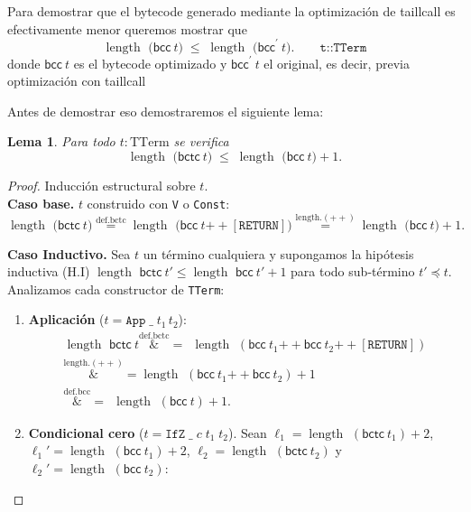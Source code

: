 \documentclass[12pt]{article}
\newcommand{\length}{\operatorname{length\  }}
\newcommand{\bcc}[1]{\mathsf{bcc}\ #1}
\newcommand{\bctc}[1]{\mathsf{bctc}\ #1}
\newcommand{\concat}{\mathbin{+\!\!+}}   %
\newtheorem{lemma}{Lema}
\theoremstyle{remark}
\newcommand{\bccp}[1]{\mathsf{bcc}^{\prime}\ #1}
\newcommand{\overeq}[1]{\overset{\mathrm{#1}}{=}}
\newcommand{\overeqa}[1]{\overset{\mathrm{#1}}&{=}}
\begin{document}
Para demostrar que el bytecode generado mediante la optimización de taillcall es efectivamente menor queremos mostrar que 
\[
  \length\!\bigl(\bcc{t}\bigr)\;\le\;
  \length\!\bigl(\bccp{t}\bigr). \qquad  \texttt{t::TTerm}
\]
donde $\bcc{t}$ es el bytecode optimizado y $\bccp{t}$ el original, es decir, previa optimización con taillcall

Antes de demostrar eso demostraremos el siguiente lema:
\begin{lemma}
Para todo $t : \mathrm{TTerm}$ se verifica
\[
  \length\bigl(\bctc{t}\bigr)\;\le\;
  \length\bigl(\bcc{t}\bigr)+1.
\]
\end{lemma}

\begin{proof}
Inducción estructural sobre $t$.  \\

\textbf{Caso base.}  
$t$ construido con \texttt{V} o \texttt{Const}:
\[
  \length\!\bigl(\bctc{t}\bigr)
   \overeq{def.bctc} \length\bigl(\bcc{t}\concat[\texttt{RETURN}]\bigr)
   \overeq{length.(++)} \length\!\bigl(\bcc{t}\bigr)+1 .
\]

\textbf{Caso Inductivo.} 
Sea $t$ un término cualquiera y supongamos la hipótesis inductiva (H.I)
$\length \bctc{t'} \le\length \bcc{t'} +1$
para todo sub‑término $t'\preccurlyeq t$.
Analizamos cada constructor de \texttt{TTerm}:

\begin{enumerate}[label=\textbf{(\alph*)},wide,topsep=4pt]
\item \textbf{Aplicación}  
      ($t=\texttt{App}\;\_\;t_1\,t_2$):
\begin{align*}
\length \bctc{t} \overeqa{def.bctc}\ \ \length (\bcc{t_1}\concat\bcc{t_2}\concat[\texttt{RETURN}]) \\
 \overeqa{length.(++)}\length (\bcc{t_1}\concat\bcc{t_2})+1 \\
 \overeqa{def.bcc}\ \ \length(\bcc{t})+1 .
\end{align*}

\item \textbf{Condicional cero}  
      ($t=\texttt{IfZ}\;\_\;c\;t_1\;t_2$).  
      Sean $\ell_1=\length(\bctc{t_1})+2$, $\ell_1'=\length(\bcc{t_1})+2$, $\ell_2=\length(\bctc{t_2})$ y $\ell_2'=\length(\bcc{t_2})$:


\end{enumerate}
\end{proof}
\end{document}

